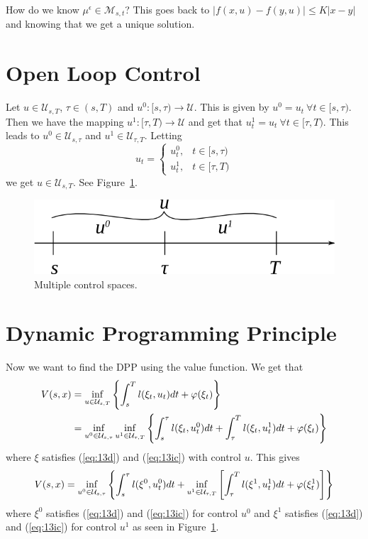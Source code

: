 How do we know $\mu^\epsilon\in\mathcal{M}_{s,t}$? This goes back to $|f(x,u)-f(y,u)|\leq K|x-y|$ and knowing that we get a unique solution.

\section{Open Loop Control}
Let $u\in\mathcal{U}_{s,T}$, $\tau\in(s,T)$ and $u^0:[s,\tau)\to\mathcal{U}$.%
This is given by $u^0=u_t~\forall t\in[s,\tau)$.%
Then we have the mapping $u^1: [\tau,T)\to\mathcal{U}$ and get that $u^1_t=u_t~\forall t\in[\tau,T)$.%
This leads to $u^0\in\mathcal{U}_{s,\tau}$ and $u^1\in\mathcal{U}_{\tau,T}$.
Letting
$$u_t=\begin{cases} u_t^0, & t\in[s,\tau) \\ u_t^1, & t\in[\tau,T) \end{cases}$$%
we get $u\in\mathcal{U}_{s,T}$.
See Figure~\ref{fig:13controlspace}.

\begin{figure}[ht!]
\centering
\includegraphics[width=.5\textwidth]{images/13controlspace}
\caption{Multiple control spaces.}
\label{fig:13controlspace}
\end{figure}

\section{Dynamic Programming Principle}
Now we want to find the DPP using the value function.
We get that
\begin{align*}
V(s,x) &= \inf_{u\in\mathcal{U}_{s,T}} \left\lbrace \int_s^T l(\xi_t,u_t)dt + \varphi(\xi_t) \right\rbrace \\
&= \inf_{u^0\in\mathcal{U}_{s,\tau}} \inf_{u^1\in\mathcal{U}_{\tau,T}} \left\lbrace \int_s^\tau l(\xi_t,u_t^0)dt + \int_\tau^T l(\xi_t,u_t^1)dt + \varphi(\xi_t) \right\rbrace
\end{align*}
where $\xi$ satisfies (\ref{eq:13d}) and (\ref{eq:13ic}) with control $u$.
This gives
\begin{align*}
V(s,x) = \inf_{u^0\in\mathcal{U}_{s,\tau}} \left\lbrace \int_s^\tau l(\xi^0,u_t^0)dt + \inf_{u^1\in\mathcal{U}_{\tau,T}} \left[\int_\tau^T l(\xi^1,u_t^1)dt + \varphi(\xi_t^1)\right]\right\rbrace
\end{align*}
where $\xi^0$ satisfies (\ref{eq:13d}) and (\ref{eq:13ic}) for control $u^0$ and $\xi^1$ satisfies (\ref{eq:13d}) and (\ref{eq:13ic}) for control $u^1$ as seen in Figure~\ref{fig:13controlspace}.

